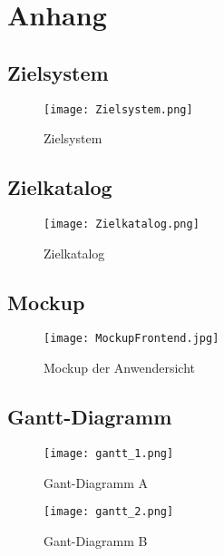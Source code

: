 \section{Anhang}
\label{sec:Anhang}

\subsection{Zielsystem}
\label{sec:Zielsystem}
\begin{figure}[htb]
\centering
\texttt{[image: Zielsystem.png]}
\caption[Zielsystem]{Zielsystem\protect\footnotemark}
\label{fig:Zielsystem}
\end{figure}

\clearpage
\begin{landscape}
  \subsection{Zielkatalog}
  \label{sec:Zielkatalog}

  \begin{figure}[htb]
    \centering
    \texttt{[image: Zielkatalog.png]}
    \caption[Zielkatallog]{Zielkatalog}
    \label{fig:Zielsystem}
  \end{figure}
\end{landscape}

\subsection{Mockup}
\label{sec:Mockup}

\begin{figure}[htb] 
\centering
\texttt{[image: MockupFrontend.jpg]}
\caption[Mockup der Anwendersicht]{Mockup der Anwendersicht\protect\footnotemark}
\label{fig:MockupFrontend}
\end{figure}

\clearpage

\begin{landscape}
  \subsection{Gantt-Diagramm}
  \label{sec:GanttDiagramm}

  \begin{figure}[htb]
    \centering
    \texttt{[image: gantt\_1.png]}
    \caption[Gantt-Diagramm A]{Gant-Diagramm A}
    \label{fig:Zielsystem}
  \end{figure}

  \begin{figure}[htb]
    \centering
    \texttt{[image: gantt\_2.png]}
    \caption[Gantt-Diagramm B]{Gant-Diagramm B}
    \label{fig:Zielsystem}
  \end{figure}
\end{landscape}


